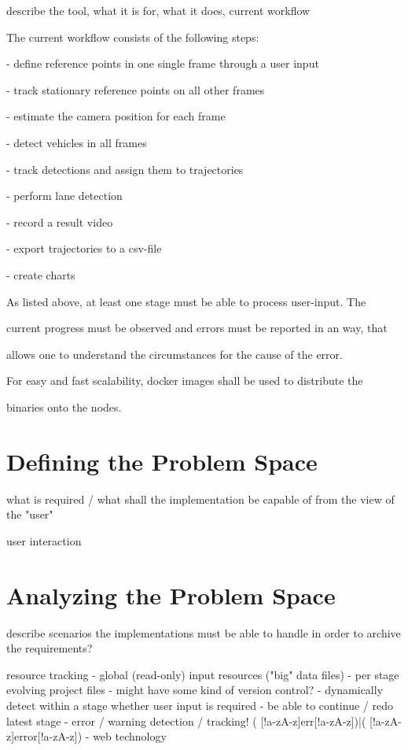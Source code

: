 

describe the tool, what it is for, what it does, current workflow

The current workflow consists of the following steps:

- define reference points in one single frame through a user input

- track stationary reference points on all other frames

- estimate the camera position for each frame

- detect vehicles in all frames

- track detections and assign them to trajectories

- perform lane detection

- record a result video

- export trajectories to a csv-file

- create charts



As listed above, at least one stage must be able to process user-input. The

current progress must be observed and errors must be reported in an way, that

allows one to understand the circumstances for the cause of the error.

For easy and fast scalability, docker images shall be used to distribute the

binaries onto the nodes.


\section{Defining the Problem Space}

what is required / what shall the implementation be capable of from the view of the "user"

user interaction



\section{Analyzing the Problem Space}

describe scenarios the implementations must be able to handle in order to archive the requirements?

resource tracking
- global (read-only) input resources ("big" data files)
- per stage evolving project files
- might have some kind of version control?
- dynamically detect within a stage whether user input is required
- be able to continue / redo latest stage
- error / warning detection / tracking!
( [!a-zA-z]err[!a-zA-z])|( [!a-zA-z]error[!a-zA-z])
- web technology

